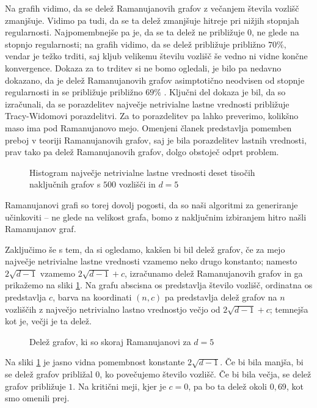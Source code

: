 Na grafih vidimo, da se delež Ramanujanovih grafov z večanjem števila vozlišč zmanjšuje. Vidimo pa tudi, da se ta delež zmanjšuje hitreje pri nižjih stopnjah regularnosti. Najpomembnejše pa je, da se ta delež ne približuje \(0\), ne glede na stopnjo regularnosti; na grafih vidimo, da se delež približuje približno \(70\%\), vendar je težko trditi, saj kljub velikemu številu vozlišč še vedno ni vidne končne konvergence. Dokaza za to trditev si ne bomo ogledali, je bilo pa nedavno dokazano, da je delež Ramanujanovih grafov asimptotično neodvisen od stopnje regularnosti in se približuje približno \(69\%\) \cite{huang2024ramanujanpropertyedgeuniversality}. Ključni del dokaza je bil, da so izračunali, da se porazdelitev največje netrivialne lastne vrednosti približuje Tracy-Widomovi porazdelitvi. Za to porazdelitev pa lahko preverimo, kolikšno maso ima pod Ramanujanovo mejo. Omenjeni članek predstavlja pomemben preboj v teoriji Ramanujanovih grafov, saj je bila porazdelitev lastnih vrednosti, prav tako pa delež Ramanujanovih grafov, dolgo obstoječ odprt problem.

\begin{figure}[H]
    \begin{center}
        
    \end{center}
    \caption{Histogram največje netrivialne lastne vrednosti deset tisočih naključnih grafov s \(500\) vozlišči in \(d=5\)}
\end{figure}

Ramanujanovi grafi so torej dovolj pogosti, da so naši algoritmi za generiranje učinkoviti -- ne glede na velikost grafa, bomo z naključnim izbiranjem hitro našli Ramanujanov graf.

Zaključimo še s tem, da si ogledamo, kakšen bi bil delež grafov, če za mejo največje netrivialne lastne vrednosti vzamemo neko drugo konstanto; namesto \(2\sqrt{d-1}\) vzamemo \(2\sqrt{d-1} + c\), izračunamo delež Ramanujanovih grafov in ga prikažemo na sliki \ref{fig:delezskoraj}. Na grafu abscisna os predstavlja število vozlišč, ordinatna os predstavlja \(c\), barva na koordinati \((n,c)\) pa predstavlja delež grafov na \(n\) vozliščih z največjo netrivialno lastno vrednostjo večjo od \(2\sqrt{d-1}+c\); temnejša kot je, večji je ta delež.
\begin{figure}[H]
    \begin{center}
        
    \end{center}
    \caption{Delež grafov, ki so skoraj Ramanujanovi za \(d=5\)}
    \label{fig:delezskoraj}
\end{figure}
Na sliki \ref{fig:delezskoraj} je jasno vidna pomembnost konstante \(2\sqrt{d-1}\). Če bi bila manjša, bi se delež grafov približal \(0\), ko povečujemo število vozlišč. Če bi bila večja, se delež grafov približuje \(1\). Na kritični meji, kjer je \(c=0\), pa bo ta delež okoli \(0{,}69\), kot smo omenili prej.

